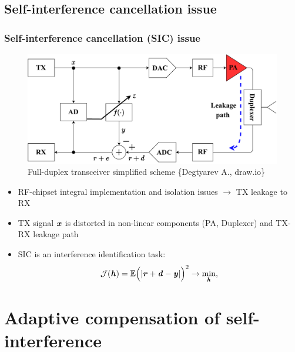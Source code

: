 \documentclass{beamer}
\newcommand{\bit}[1]{\ensuremath{\textbf{\textit{#1}}}}
\newcommand{\dsp}{\ensuremath{\displaystyle}}
\begin{document}
\subsection{Self-interference cancellation issue}
\begin{frame}
	\frametitle{Self-interference cancellation (SIC) issue}
	\begin{figure}[htbp]
		\centering
		\includegraphics[scale=0.33]{../figures/ident_problem/ident_problem.pdf}
		\caption{Full-duplex transceiver simplified scheme \{Degtyarev A., draw.io\}}
	\end{figure}
	\begin{itemize}
		\item RF-chipset integral implementation and isolation issues $\rightarrow$ TX leakage to RX
		\item TX signal $\bit{x}$ is distorted in non-linear components (PA, Duplexer) and TX-RX leakage path
		\item SIC is an interference identification task:
		\begin{equation}
			\dsp\mathcal{J}(\bit{h})=\mathbb{E}\Big(|\bit{r}+\bit{d}-\bit{y}|\Big)^2\rightarrow\min_{\bit{h}},
		\end{equation}
	\end{itemize}
\end{frame}

\section{Adaptive compensation of self-interference}
\end{document}
